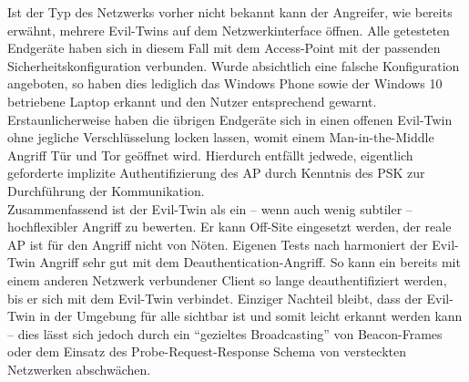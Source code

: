 Ist der Typ des Netzwerks vorher nicht bekannt kann der Angreifer, wie bereits erwähnt, mehrere Evil-Twins auf dem Netzwerkinterface öffnen.
Alle getesteten Endgeräte haben sich in diesem Fall mit dem Access-Point mit der passenden Sicherheitskonfiguration verbunden.
Wurde absichtlich eine falsche Konfiguration angeboten, so haben dies lediglich das Windows Phone sowie der Windows 10 betriebene Laptop erkannt und den Nutzer entsprechend gewarnt. %
Erstaunlicherweise haben die übrigen Endgeräte sich in einen offenen Evil-Twin ohne jegliche Verschlüsselung locken lassen, womit einem Man-in-the-Middle Angriff Tür und Tor geöffnet wird. Hierdurch entfällt jedwede, eigentlich geforderte implizite Authentifizierung des AP durch Kenntnis des PSK zur Durchführung der Kommunikation.\\

Zusammenfassend ist der Evil-Twin als ein -- wenn auch wenig subtiler -- hochflexibler Angriff zu bewerten. Er kann Off-Site eingesetzt werden, der reale AP ist für den Angriff nicht von Nöten.
Eigenen Tests nach harmoniert der Evil-Twin Angriff sehr gut mit dem Deauthentication-Angriff.
So kann ein bereits mit einem anderen Netzwerk verbundener Client so lange deauthentifiziert werden, bis er sich mit dem Evil-Twin verbindet.
Einziger Nachteil bleibt, dass der Evil-Twin in der Umgebung für alle sichtbar ist und somit leicht erkannt werden kann -- dies lässt sich jedoch durch ein \enquote{gezieltes Broadcasting} von Beacon-Frames oder dem Einsatz des Probe-Request-Response Schema von versteckten Netzwerken abschwächen.


